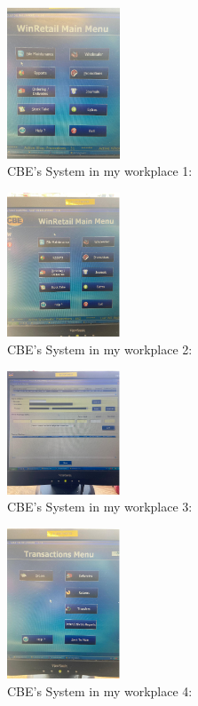 \begin{figure}[h!]
	\caption{CBE's System in my workplace 1:}
	\label{image:mace1}
	\centering
	\includegraphics[width=0.3\textwidth]{images/mace1.PNG}
\end{figure}

\begin{figure}[h!]
	\caption{CBE's System in my workplace 2:}
	\label{image:mace2}
	\centering
	\includegraphics[width=0.3\textwidth]{images/mace2.PNG}
\end{figure}

\begin{figure}[h!]
	\caption{CBE's System in my workplace 3:}
	\label{image:mace3}
	\centering
	\includegraphics[width=0.3\textwidth]{images/mace3.PNG}
\end{figure}

\begin{figure}[h!]
	\caption{CBE's System in my workplace 4:}
	\label{image:mace4}
	\centering
	\includegraphics[width=0.3\textwidth]{images/mace4.PNG}
\end{figure}

